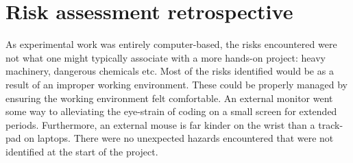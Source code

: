 \section{Risk assessment retrospective}

As experimental work was entirely computer-based, the risks encountered were not what one might typically associate with a more hands-on project: heavy machinery, dangerous chemicals etc. Most of the risks identified would be as a result of an improper working environment. These could be properly managed by ensuring the working environment felt comfortable. An external monitor went some way to alleviating the eye-strain of coding on a small screen for extended periods. Furthermore, an external mouse is far kinder on the wrist than a track-pad on laptops. There were no unexpected hazards encountered that were not identified at the start of the project.